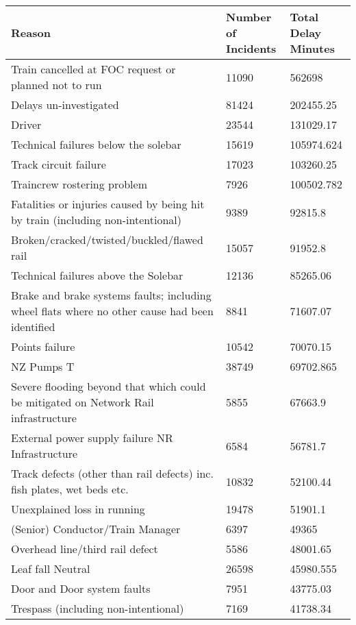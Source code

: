 \documentclass[11pt,paper=a4]{article}
\begin{document}
\begin{landscape}

\begin{longtabu} to \textwidth {|X[1 , p ] |X[0.5 , c ] | X[0.5 , c ]}\firsthline\hline
Reason  & Number of Incidents & Total Delay Minutes \\ \hline
%
\endhead


 Train cancelled at FOC request or planned not to run & 11090 & 562698 \\
    Delays un-investigated & 81424 & 202455.25 \\
    Driver & 23544 & 131029.17 \\
    Technical failures below the solebar & 15619 & 105974.624 \\
    Track circuit failure & 17023 & 103260.25 \\
    Traincrew rostering problem & 7926  & 100502.782 \\
    Fatalities or  injuries caused by being hit by train (including non-intentional) & 9389  & 92815.8 \\
    Broken/cracked/twisted/buckled/flawed rail & 15057 & 91952.8 \\
    Technical failures above the Solebar & 12136 & 85265.06 \\
    Brake and brake systems faults; including wheel flats where no other cause had been identified & 8841  & 71607.07 \\
    Points failure & 10542 & 70070.15 \\
    NZ Pumps T & 38749 & 69702.865 \\
    Severe flooding beyond that which could be mitigated on Network Rail infrastructure & 5855  & 67663.9 \\
    External power supply failure NR Infrastructure & 6584  & 56781.7 \\
    Track defects (other than rail defects) inc. fish plates, wet beds etc. & 10832 & 52100.44 \\
    Unexplained loss in running & 19478 & 51901.1 \\
    (Senior) Conductor/Train Manager & 6397  & 49365 \\
    Overhead line/third rail defect & 5586  & 48001.65 \\
    Leaf fall Neutral & 26598 & 45980.555 \\
    Door and Door system faults & 7951  & 43775.03 \\
    Trespass (including non-intentional) & 7169  & 41738.34 \\

\end{longtabu}
\end{landscape}
\end{document}
